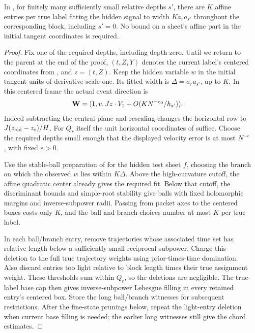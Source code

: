 \begin{lemma}
\label{a06:horizontal-affine-approximation}
In , for finitely many sufficiently small
relative depths \(s'\), there are \(K\) affine entries per true label
fitting the hidden signal to width \(Ka_ra_{s'}\) throughout the
corresponding block, including \(s'=0\).  No bound on a sheet's affine
part in the initial tangent coordinates is required.
\end{lemma}
\begin{proof}
Fix one of the required depths, including depth zero.  Until we return
to the parent at the end of the proof, \((t,Z,Y)\) denotes the current
label's centered coordinates from ,
and \(z=(t,Z)\).  Keep the hidden variable \(w\) in the initial tangent
units of derivative scale one.  Its fitted width is
\(\Delta=a_ra_{s'}\), up to \(K\).  In this centered frame the actual
event direction is
\[
 {\bf W}=(1,v,Jz\cdot V_1+O(KN^{-e_0}/h_{s'})).
\]
Indeed subtracting the central plane and rescaling changes the
horizontal row to \(J(z_{\rm old}-z_c)/H\).  For \(Q_r\) itself the
unit horizontal coordinates of  suffice.
Choose the required depths small enough that the displayed velocity
error is at most \(N^{-e}\), with fixed \(e>0\).

Use the stable-ball preparation of  for
the hidden test sheet \(f\), choosing the branch on which the observed
\(w\) lies within \(K\Delta\).  Above the high-curvature cutoff, the
affine quadratic center already gives the required fit.  Below that
cutoff, the discriminant bounds and simple-root stability give balls
with fixed holomorphic margins and inverse-subpower radii.  Passing
from packet axes to the centered boxes costs only \(K\), and the
ball and branch choices number at most \(K\) per true label.

In each ball/branch entry, remove trajectories whose associated time
set has relative length below a sufficiently small reciprocal
subpower.  Charge this deletion to the full true trajectory weights
using prior-times-time domination.  Also discard entries too light
relative to block length times their true assignment weight.  These
thresholds sum within \(Q_r\), so the deletions are negligible.
The true-label base cap then gives inverse-subpower Lebesgue filling
in every retained entry's centered box.  Store the long ball/branch
witnesses for subsequent restrictions.  After the fine-state prunings
below, repeat the light-entry deletion when current base filling is
needed; the earlier long witnesses still give the chord estimates.


\end{proof}
